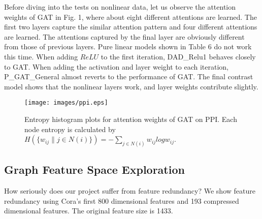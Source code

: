\documentclass[preprint,11pt]{elsarticle}
\begin{document}
Before diving into the tests on nonlinear data, let us observe the attention weights of GAT in Fig. 1, where about eight different attentions are learned. The first two layers capture the similar attention pattern and four different attentions are learned. The attentions captured by the final layer are obviously different from those of previous layers. Pure linear models shown in Table 6 do not work this time. When adding $ReLU$ to the first iteration, DAD\_Relu1 behaves closely to GAT. When adding the activation and layer weight to each iteration, P\_GAT\_General almost reverts to the performance of GAT. The final contrast model shows that the nonlinear layers work, and layer weights contribute slightly.
\begin{figure}
  \centering
  \texttt{[image: images/ppi.eps]}
  \caption{Entropy histogram plots for attention weights of GAT on PPI. Each node entropy is calculated by $H(\{w_{ij}\| j\in N(i)\}) = -\sum_{j\in N(i)} w_{ij} log w_{ij}$.}
\end{figure}

\subsection{Graph Feature Space Exploration}

How seriously does our project suffer from feature redundancy? We show feature redundancy using Cora’s first 800 dimensional features and 193 compressed dimensional features. The original feature size is 1433.
\end{document}
